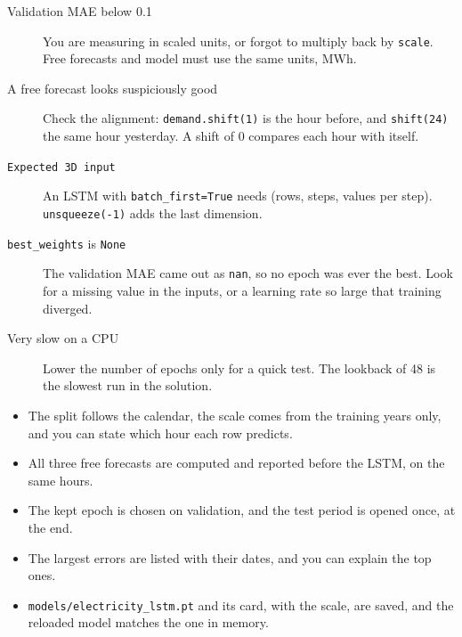 \begin{troubleshoot}
\begin{description}
  \item[Validation MAE below 0.1] You are measuring in scaled units, or forgot to multiply back by \texttt{scale}. Free forecasts and model must use the same units, MWh.
  \item[A free forecast looks suspiciously good] Check the alignment: \texttt{demand.shift(1)} is the hour before, and \texttt{shift(24)} the same hour yesterday. A shift of 0 compares each hour with itself.
  \item[\texttt{Expected 3D input}] An LSTM with \texttt{batch\_first=True} needs (rows, steps, values per step). \texttt{unsqueeze(-1)} adds the last dimension.
  \item[\texttt{best\_weights} is \texttt{None}] The validation MAE came out as \texttt{nan}, so no epoch was ever the best. Look for a missing value in the inputs, or a learning rate so large that training diverged.
  \item[Very slow on a CPU] Lower the number of epochs only for a quick test. The lookback of 48 is the slowest run in the solution.
\end{description}
\end{troubleshoot}

\begin{labchecklists}
\begin{verification}
\begin{itemize}
  \item The split follows the calendar, the scale comes from the training years only, and you can state which hour each row predicts.
  \item All three free forecasts are computed and reported before the LSTM, on the same hours.
  \item The kept epoch is chosen on validation, and the test period is opened once, at the end.
  \item The largest errors are listed with their dates, and you can explain the top ones.
  \item \texttt{models/electricity\_lstm.pt} and its card, with the scale, are saved, and the reloaded model matches the one in memory.
\end{itemize}
\end{verification}
\end{labchecklists}
